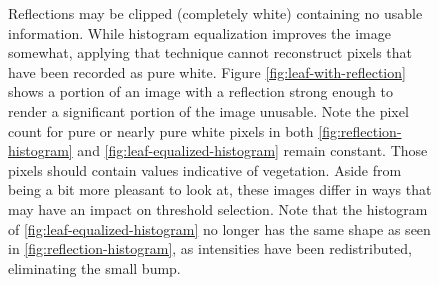\documentclass[agriculture,article,submit,pdftex,moreauthors]{Definitions/mdpi}
\begin{document}
\begin{figure}[H]
	\centering
	\hfill
	\hfill
	\hfill
	\caption[Reflection problems in segmented vegetation]{Reflections may be clipped (completely white) containing no usable information. While histogram equalization improves the image somewhat, applying that technique cannot reconstruct pixels that have been recorded as pure white. Figure \ref{fig:leaf-with-reflection} shows a portion of an image with a reflection strong enough to render a significant portion of the image unusable. Note the pixel count for pure or nearly pure white pixels in both \ref{fig:reflection-histogram} and \ref{fig:leaf-equalized-histogram} remain constant.  Those pixels should contain values indicative of vegetation. Aside from being a bit more pleasant to look at, these images differ in ways that may have an impact on threshold selection. Note that the histogram of \ref{fig:leaf-equalized-histogram} no longer has the same shape as seen in \ref{fig:reflection-histogram}, as intensities have been redistributed, eliminating the small bump.}
	\label{fig:reflection}
\end{figure}
\end{document}

